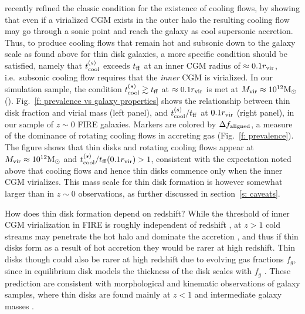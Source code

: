 \documentclass[fleqn,usenatbib]{mnras}
\newcommand{\Rvir}{r_{\rm vir}}
\newcommand{\msun}{{\rm M}_\odot}
\begin{document}

\cite{Stern2020} recently refined the classic condition for the existence of cooling flows, by showing that even if a virialized CGM exists in the outer halo
the resulting cooling flow may go through a sonic point and reach the galaxy as cool supersonic accretion.
Thus, to produce cooling flows that remain hot and subsonic down to the galaxy scale as found above for thin disk galaxies, a more specific condition should be satisfied, namely that $t_{\rm cool}^{(s)}$ exceeds $t_{\rm ff}$ at an inner CGM radius of $\approx0.1 r_{\rm vir}$, i.e.~subsonic cooling flow requires that the \textit{inner} CGM is virialized. 
In our simulation sample, the condition $t_{\rm cool}^{(s)}\gtrsim t_{\rm ff}$ at $\approx0.1 r_{\rm vir}$ is met at $\Mvir\approx10^{12}\msun$ (\citealt{Stern2021}). 
Fig.~\ref{f: prevalence vs galaxy properties} shows the relationship between thin disk fraction and virial mass (left panel), and $t_{\rm cool}^{(s)}/t_{\rm ff}$ at $0.1 r_{\rm vir}$ (right panel), in our sample of $z\sim0$ FIRE galaxies.
Markers are colored by $\Delta f_{\rm aligned}$, a measure of the dominance of rotating cooling flows in accreting gas (Fig.~\ref{f: prevalence}).
The figure shows that thin disks and rotating cooling flows appear at $M_{\rm vir}\approx 10^{12}\msun$ and $\tcoolsh/\tff(0.1\Rvir)>1$, consistent with the expectation noted above that cooling flows and hence thin disks commence only when the inner CGM virializes.
This mass scale for thin disk formation is however somewhat larger than in $z\sim0$ observations, as further discussed in section~\ref{s: caveats}.


How does thin disk formation depend on redshift?
While the threshold of inner CGM virialization in FIRE is roughly independent of redshift \citep{Stern2021,Stern2021a}, at $z>1$
cold streams may penetrate the hot halo and dominate the accretion \cite[e.g.,][]{Keres2005,Dekel2006, Dekel2009}, and thus if thin disks form as a result of hot accretion they would be rarer at high redshift.
Thin disks though could also be rarer at high redshift due to evolving gas fractions $f_g$, since in equilibrium disk models the thickness of the disk scales with $f_g$ \citep{Thompson2005, Faucher-Giguere2013, Krumholz2018}.
These prediction are consistent with morphological and kinematic observations of galaxy samples, where thin disks are found mainly at $z<1$ and intermediate galaxy masses \citep[e.g.,][]{Kassin2012, vanderWel14}. 
\end{document}

